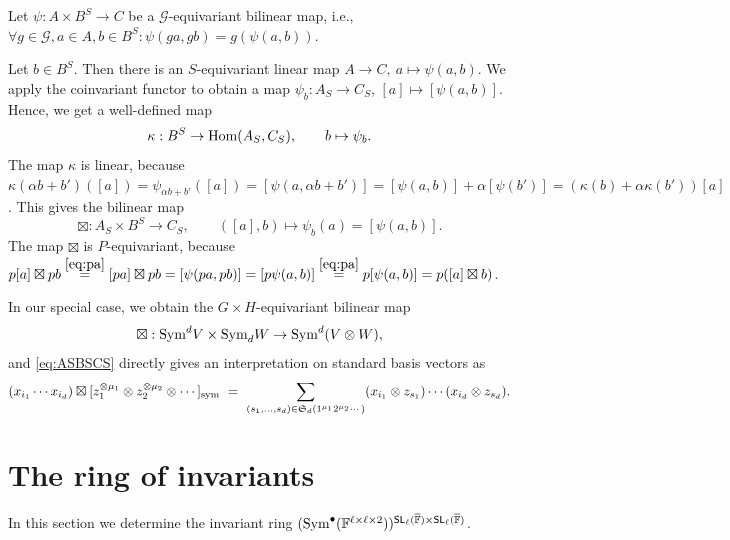 \documentclass[a4paper]{extarticle}
\newcommand{\aS}{\mathfrak{S}}
\newcommand{\IF}{\mathbb{F}}
\newcommand{\oIF}{{\overline{\mathbb{F}}}}
\newcommand{\SL}{\textsf{\textup{SL}}}
\newcommand{\Sym}{\textup{Sym}}
\newcommand{\sym}{\textup{sym}}
\newcommand{\Hom}{\textup{Hom}}
\numberwithin{theorem}{section}
\theoremstyle{definition}
\begin{document}
Let $\psi: A \times B^S \to C$ be a $\mathcal{G}$-equivariant bilinear map,
i.e.,
$\forall g\in \mathcal{G}, a \in A, b \in B^S: \psi(ga,gb)=g(\psi(a,b))$.

Let $b\in B^S$. Then there is an $S$-equivariant linear map $A\to C, \ a \mapsto \psi(a,b)$.
We apply the coinvariant functor to obtain a map $\psi_b : A_S\to C_S$, $[a]\mapsto [\psi(a,b)]$.
Hence, we get a well-defined map
\[
\kappa: B^S \to \Hom(A_S, C_S), \qquad b \mapsto \psi_b.
\]
The map $\kappa$ is linear, because $\kappa(\alpha b+b')([a])=\psi_{\alpha b+b'}([a])=[\psi(a,\alpha b+b')]=[\psi(a,b)]+\alpha [\psi(b')]=(\kappa(b)+\alpha\kappa(b'))[a]$.
This gives the bilinear map
\begin{equation}\label{eq:ASBSCS}
\boxtimes : A_S \times B^S \to C_S, \qquad ([a],b) \mapsto \psi_b(a) = [\psi(a,b)].
\end{equation}
The map $\boxtimes$ is $P$-equivariant, because $p[a]\boxtimes pb \stackrel{\eqref{eq:pa}}{=} [pa]\boxtimes pb =    [\psi(pa,pb)] = [p\psi(a,b)] \stackrel{\eqref{eq:pa}}{=} p [\psi(a,b)]=  p ([a]\boxtimes b)$.

In our special case, we obtain the $G\times H$-equivariant bilinear map
\[
\boxtimes: \Sym^d V \times \Sym_d W \to \Sym^d(V\otimes W),
\]
and \eqref{eq:ASBSCS} directly gives an interpretation on standard basis vectors as
\begin{equation}\label{eq:defboxtimes}
(x_{i_1} \cdots x_{i_d}) \boxtimes [z_1^{\otimes \mu_1} \otimes z_2^{\otimes \mu_2} \otimes \cdots]_{\sym}
 \ = \ 
\sum_{(s_1,\ldots,s_d)\in\aS_d(1^{\mu_1} 2^{\mu_2}\cdots)}
(x_{i_1}\otimes z_{s_1}) \cdots (x_{i_d}\otimes z_{s_d}).
\end{equation}















\section{The ring of invariants}
In this section we determine the invariant ring $(\Sym^{\bullet}(\IF^{\ell\times\ell\times2}))^{\SL_\ell(\oIF)\times \SL_\ell(\oIF)}$.
 
 
 
\end{document}
